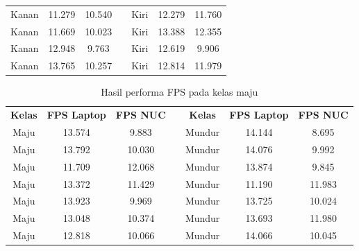 \begin{longtable}{|c|c|c|c|c|c|c|}
  Kanan          & 11.279              & 10.540           &  & Kiri           & 12.279              & 11.760           \\ \cline{1-3} \cline{5-7} 
  Kanan          & 11.669              & 10.023           &  & Kiri           & 13.388              & 12.355           \\ \cline{1-3} \cline{5-7} 
  Kanan          & 12.948              & 9.763            &  & Kiri           & 12.619              & 9.906            \\ \cline{1-3} \cline{5-7} 
  Kanan          & 13.765              & 10.257           &  & Kiri           & 12.814              & 11.979           \\ \cline{1-3} \cline{5-7} 
\end{longtable}

\begin{longtable}{|c|c|c|c|c|c|c|}
  \caption{Hasil performa FPS pada kelas maju}
  \label{tb:fpsmajumundur} \\ 
  \cline{1-3} \cline{5-7}
  \rowcolor[HTML]{C0C0C0}
  \textbf{Kelas} & \textbf{FPS Laptop} & \textbf{FPS NUC} &\cellcolor[HTML]{FFFFFF}  & \textbf{Kelas} & \textbf{FPS Laptop} & \textbf{FPS NUC} \\ \cline{1-3} \cline{5-7} 
  Maju           & 13.574              & 9.883            &  & Mundur         & 14.144              & 8.695            \\ \cline{1-3} \cline{5-7} 
  Maju           & 13.792              & 10.030           &  & Mundur         & 14.076              & 9.992            \\ \cline{1-3} \cline{5-7} 
  Maju           & 11.709              & 12.068           &  & Mundur         & 13.874              & 9.845            \\ \cline{1-3} \cline{5-7} 
  Maju           & 13.372              & 11.429           &  & Mundur         & 11.190              & 11.983           \\ \cline{1-3} \cline{5-7} 
  Maju           & 13.923              & 9.969            &  & Mundur         & 13.725              & 10.024           \\ \cline{1-3} \cline{5-7} 
  Maju           & 13.048              & 10.374           &  & Mundur         & 13.693              & 11.980           \\ \cline{1-3} \cline{5-7} 
  Maju           & 12.818              & 10.066           &  & Mundur         & 14.066              & 10.045           \\ \cline{1-3} \cline{5-7} 

\end{longtable}

